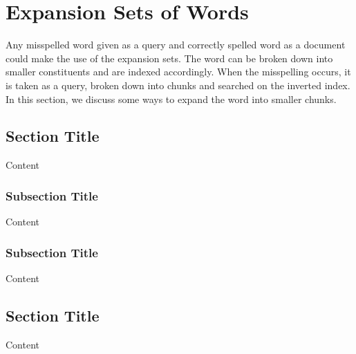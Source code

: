 
\chapter{Expansion Sets of Words} %

\label{ch:expand} %

Any misspelled word given as a query and correctly spelled word as a document could make the use of the expansion sets. 
The word can be broken down into smaller constituents and are indexed accordingly.
When the misspelling occurs, it is taken as a query, broken down into chunks and searched on the inverted index.
In this section, we discuss some ways to expand the word into smaller chunks.


\section{Section Title}

Content


\subsection{Subsection Title}

Content


\subsection{Subsection Title}

Content


\section{Section Title}

Content